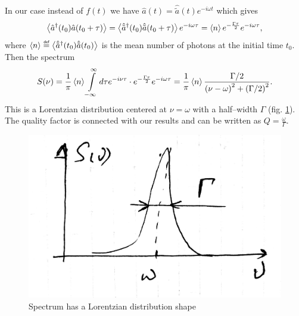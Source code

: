 In our case instead of $f(t)$ we have $ \hat{a}(t) = \hat{\tilde{a}}(t) e^{-i \omega t}$ which gives
\begin{equation}
	\left\langle {\hat{a}^{\dagger}(t_0) \hat{a}(t_0 + \tau)} \right\rangle = \left\langle {\hat{\tilde{a}}^{\dagger}(t_0) \hat{\tilde{a}}(t_0 + \tau)} \right\rangle e^{- i \omega \tau} = \left\langle {n} \right\rangle e^{- \frac{\Gamma\tau}{2}} e^{-i\omega \tau},
\end{equation}
where $\av{n} \myeq  \av{\hat{\tilde{a}}^{\dagger}(t_0) \hat{\tilde{a}}(t_0)}$ is the mean number of photons at the initial time $t_0$. Then the spectrum
\begin{equation}
	S(\nu) = \frac{1}{\pi} \left\langle {n} \right\rangle  \int \limits_{-\infty}^{\infty} d \tau e^{-i \nu \tau} \cdot e^{- \frac{\Gamma\tau}{2}} e^{-i\omega \tau} = \frac{1}{\pi} \left\langle {n} \right\rangle \frac{\Gamma/2}{\left( \nu - \omega \right)^2 + \left(\Gamma/2\right)^2}.
\end{equation}
This is a Lorentzian distribution centered at $\nu = \omega$ with a half--width $\Gamma$ (fig. \ref{fig:loren}). The quality factor is connected with our results and can be written as $Q = \frac{\omega}{\Gamma}$.

\begin{figure}[h!]
	\centering
	\includegraphics[width=0.4\linewidth]{fig/L9/L_1}
	\caption{Spectrum has a Lorentzian distribution shape}
	\label{fig:loren}
\end{figure}
